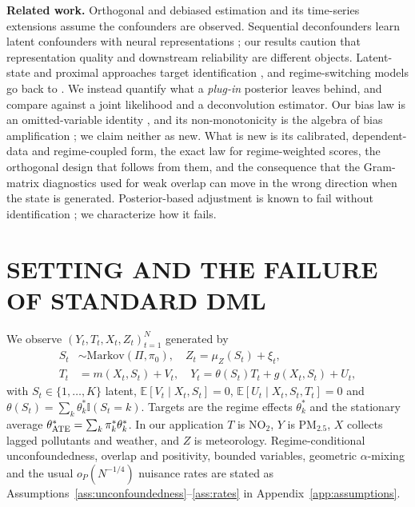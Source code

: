 \documentclass[twoside]{article}
\theoremstyle{definition}
\newcommand{\E}{\mathbb{E}}
\newcommand{\one}{\mathbb{I}}
\begin{document}
\textbf{Related work.} Orthogonal and debiased estimation \citep{chernozhukov2018double,chernozhukov2022automatic,foster2023orthogonal,nie2021quasi} and its time-series extensions \citep{lewis2020double,semenova2023generalized,ciganovic2026dml} assume the confounders are observed. Sequential deconfounders learn latent confounders with neural representations \citep{bica2020time,hatt2021sequential}; our results caution that representation quality and downstream reliability are different objects. Latent-state and proximal approaches target identification \citep{miao2018identifying,tchetgen2020introduction,mastouri2021proximal,cui2024semiparametric,clouth2024latent}, and regime-switching models go back to \citet{hamilton1989new}. We instead quantify what a \emph{plug-in} posterior leaves behind, and compare against a joint likelihood and a deconvolution estimator. Our bias law is an omitted-variable identity \citep{greenland1980effect,cinelli2020making,chernozhukov2022long}, and its non-monotonicity is the algebra of bias amplification \citep{pearl2012bias,ding2017instrumental}; we claim neither as new. What is new is its calibrated, dependent-data and regime-coupled form, the exact law for regime-weighted scores, the orthogonal design that follows from them, and the consequence that the Gram-matrix diagnostics used for weak overlap \citep{crump2009dealing,damour2021overlap} can move in the wrong direction when the state is generated. Posterior-based adjustment is known to fail without identification \citep{wang2019blessings,damour2019multicause}; we characterize how it fails.

\section{SETTING AND THE FAILURE OF STANDARD DML}
\label{sec:setup}

We observe $(Y_t,T_t,X_t,Z_t)_{t=1}^N$ generated by
\begin{align}
S_t&\sim\mathrm{Markov}(\Pi,\pi_0),\quad Z_t=\mu_Z(S_t)+\xi_t, \label{eq:scm1}\\
T_t&=m(X_t,S_t)+V_t,\quad Y_t=\theta(S_t)T_t+g(X_t,S_t)+U_t, \label{eq:scm2}
\end{align}
with $S_t\in\{1,\dots,K\}$ latent, $\E[V_t\mid X_t,S_t]=0$, $\E[U_t\mid X_t,S_t,T_t]=0$ and $\theta(S_t)=\sum_k\theta_k^*\one(S_t=k)$. Targets are the regime effects $\theta_k^*$ and the stationary average $\theta^*_{\rm ATE}=\sum_k\pi_k^*\theta_k^*$. In our application $T$ is NO$_2$, $Y$ is PM$_{2.5}$, $X$ collects lagged pollutants and weather, and $Z$ is meteorology. Regime-conditional unconfoundedness, overlap and positivity, bounded variables, geometric $\alpha$-mixing and the usual $o_P(N^{-1/4})$ nuisance rates are stated as Assumptions~\ref{ass:unconfoundedness}--\ref{ass:rates} in Appendix~\ref{app:assumptions}.
\end{document}
